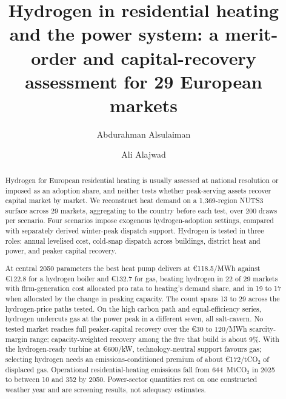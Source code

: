 \documentclass[review]{elsarticle}
\begin{document}
\begin{frontmatter}

\title{Hydrogen in residential heating and the power system: a merit-order and capital-recovery assessment for 29 European markets}

\author[oies]{Abdurahman Alsulaiman}
\author[jhu,cornell]{Ali Alajwad}

\begin{abstract}
Hydrogen for European residential heating is usually assessed at national resolution or imposed as an adoption share, and neither tests whether peak-serving assets recover capital market by market. We reconstruct heat demand on a 1{,}369-region NUTS3 surface across 29 markets, aggregating to the country before each test, over 200 draws per scenario. Four scenarios impose exogenous hydrogen-adoption settings, compared with separately derived winter-peak dispatch support. Hydrogen is tested in three roles: annual levelised cost, cold-snap dispatch across buildings, district heat and power, and peaker capital recovery.

At central 2050 parameters the best heat pump delivers at \euro{}118.5/MWh against \euro{}122.8 for a hydrogen boiler and \euro{}132.7 for gas, beating hydrogen in 22 of 29 markets with firm-generation cost allocated pro rata to heating's demand share, and in 19 to 17 when allocated by the change in peaking capacity. The count spans 13 to 29 across the hydrogen-price paths tested. On the high carbon path and equal-efficiency series, hydrogen undercuts gas at the power peak in a different seven, all salt-cavern. No tested market reaches full peaker-capital recovery over the \euro{}30 to 120/MWh scarcity-margin range; capacity-weighted recovery among the five that build is about 9\%. With the hydrogen-ready turbine at \euro{}600/kW, technology-neutral support favours gas; selecting hydrogen needs an emissions-conditioned premium of about \euro{}172/tCO$_2$ of displaced gas.
Operational residential-heating emissions fall from 644~MtCO$_2$ in 2025 to between 10 and 352 by 2050. Power-sector quantities rest on one constructed weather year and are screening results, not adequacy estimates.
\end{abstract}


\end{frontmatter}
\end{document}
